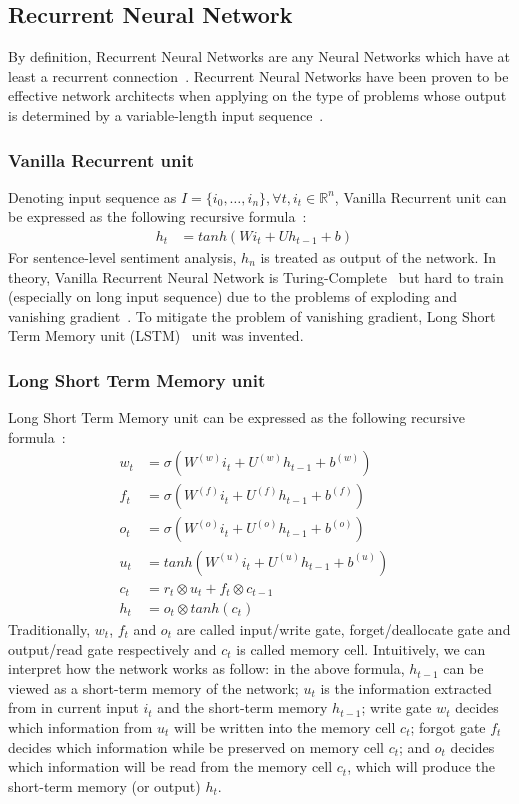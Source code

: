 \subsection{Recurrent Neural Network}
By definition, Recurrent Neural Networks are any Neural Networks which have at least a recurrent connection~\cite{rnn-def}.
Recurrent Neural Networks have been proven to be effective network architects when applying on the type of problems whose output is determined by a variable-length input sequence~\cite{speech-lstm,SutskeverVL14,mikolov-nlm}.
\subsubsection{Vanilla Recurrent unit}\label{sec:vanilla-rnn}
Denoting input sequence as \(I = \{i_0,\ldots,i_n\}, \forall t, i_t \in \mathbb{R}^n\), Vanilla Recurrent unit can be expressed as the following recursive formula~\cite{treeLSTM}:
\begin{align}
h_t &= tanh(Wi_t + Uh_{t-1} + b)&
\end{align}
For sentence-level sentiment analysis, \(h_n\) is treated as output of the network.
In theory, Vanilla Recurrent Neural Network is Turing-Complete~\cite{rnn-turing-complete} but hard to train (especially on long input sequence) due to the problems of exploding and vanishing gradient~\cite{Bengio1994}.
To mitigate the problem of vanishing gradient, Long Short Term Memory unit (LSTM)~\cite{originLSTM} unit was invented.
\subsubsection{Long Short Term Memory unit}\label{sec:lstm}
Long Short Term Memory unit can be expressed as the following recursive formula~\cite{treeLSTM}:
\begin{align}
w_t &= \sigma(W^{(w)}i_t + U^{(w)}h_{t-1} + b^{(w)}) \label{eq:lstm-input-gate}&\\
f_t &= \sigma(W^{(f)}i_t + U^{(f)}h_{t-1} + b^{(f)}) \label{eq:lstm-forget-gate}&\\
o_t &= \sigma(W^{(o)}i_t + U^{(o)}h_{t-1} + b^{(o)}) \label{eq:lstm-output-gate}&\\
u_t &= tanh(W^{(u)}i_t + U^{(u)}h_{t-1} + b^{(u)}) \label{eq:lstm-update-gate}&\\
c_t &= r_t \otimes u_t + f_t \otimes c_{t-1} \label{eq:longterm-mem}&\\
h_t &= o_t \otimes tanh(c_t) \label{eq:temperal-mem}&
\end{align}
Traditionally, \(w_t\), \(f_t\) and \(o_t\) are called input/write gate, forget/deallocate gate and output/read gate respectively and \(c_t\) is called memory cell.
Intuitively, we can interpret how the network works as follow: 
in the above formula, \(h_{t-1}\) can be viewed as a short-term memory of the network; 
\(u_t\) is the information extracted from in current input \(i_t\) and the short-term memory \(h_{t-1}\); 
write gate \(w_t\) decides which information from \(u_t\) will be written into the memory cell \(c_t\); 
forgot gate \(f_t\) decides which information while be preserved on memory cell \(c_t\); 
and \(o_t\) decides which information will be read from the memory cell \(c_t\), which will produce the short-term memory (or output) \(h_t\).

